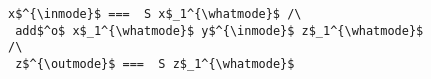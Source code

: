 \begin{figure}[!t]
  \centering
  \begin{minipage}{0.55\columnwidth}
    \begin{lstlisting}[frame=tb]
 x$^{\inmode}$ ===  S x$_1^{\whatmode}$ /\
 add$^o$ x$_1^{\whatmode}$ y$^{\inmode}$ z$_1^{\whatmode}$ /\
 z$^{\outmode}$ ===  S z$_1^{\whatmode}$
    \end{lstlisting}
  \end{minipage}
\end{figure}
